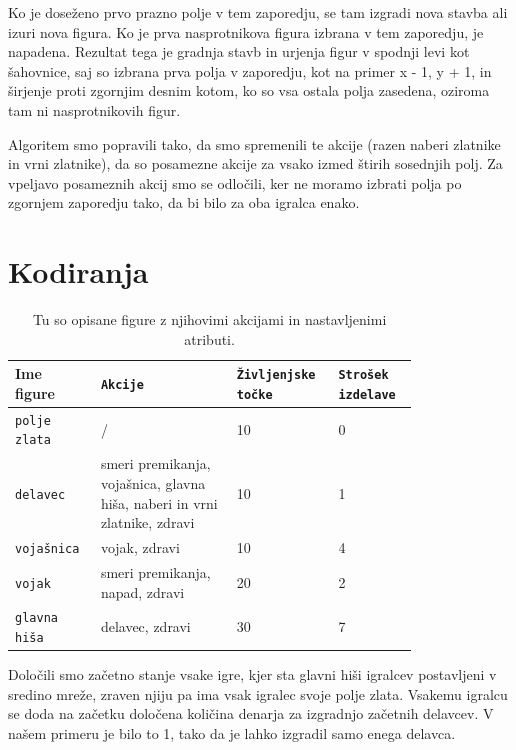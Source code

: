 \documentclass[a4paper, 12pt]{book}
\begin{document}
Ko je doseženo prvo prazno polje v tem zaporedju, se tam izgradi nova stavba ali izuri nova figura.
Ko je prva nasprotnikova figura izbrana v tem zaporedju, je napadena.
Rezultat tega je gradnja stavb in urjenja figur v spodnji levi kot šahovnice, saj so izbrana prva polja v zaporedju, kot na primer x - 1, y + 1, in širjenje proti zgornjim desnim kotom, ko so vsa ostala polja zasedena, oziroma tam ni nasprotnikovih figur.

Algoritem smo popravili tako, da smo spremenili te akcije (razen naberi zlatnike in vrni zlatnike), da so posamezne akcije za vsako izmed štirih sosednjih polj.
Za vpeljavo posameznih akcij smo se odločili, ker ne moramo izbrati polja po zgornjem zaporedju tako, da bi bilo za oba igralca enako.

\section{Kodiranja}
\label{kodiranja}
\begin{table}
	\begin{center}
	\begin{tabular}{p{0.15\linewidth}|p{0.3\linewidth}|p{0.18\linewidth}|p{0.17\linewidth}}
		Ime figure          & {\tt Akcije}                                                              & {\tt Življenjske točke} & {\tt Strošek izdelave} \\ \hline
		{\tt polje zlata}   & /                                                                         & 10            & 0 \\
		{\tt delavec}       & smeri premikanja, vojašnica, glavna hiša, naberi in vrni zlatnike, zdravi & 10            & 1 \\
		{\tt vojašnica}     & vojak, zdravi                                                             & 10            & 4 \\
		{\tt vojak}         & smeri premikanja, napad, zdravi                                           & 20            & 2 \\
		{\tt glavna hiša}   & delavec, zdravi                                                           & 30            & 7 \\
	\end{tabular}
	\end{center}
	\caption{Tu so opisane figure z njihovimi akcijami in nastavljenimi atributi.}
	\label{tabelfigures}
\end{table}

Določili smo začetno stanje vsake igre, kjer sta glavni hiši igralcev postavljeni v sredino mreže, zraven njiju pa ima vsak igralec svoje polje zlata. 
Vsakemu igralcu se doda na začetku določena količina denarja za izgradnjo začetnih delavcev. V našem primeru je bilo to 1, tako da je lahko izgradil samo enega delavca.
\end{document}
